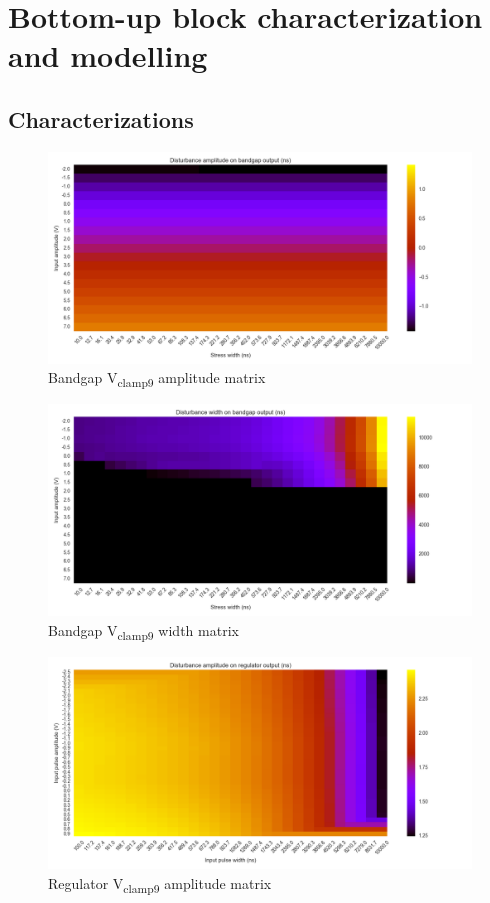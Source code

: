 \chapter{Bottom-up block characterization and modelling}
\section{Characterizations}
\label{apx:block-cz}

\begin{figure}[!h]
  \centering
  \includegraphics[width=\textwidth]{src/4/figures/bandgap_cz_v2_amplitude.png}
  \caption{Bandgap V\textsubscript{clamp9} amplitude matrix}
  \label{fig:bg_amp}
\end{figure}

\begin{figure}[!h]
  \centering
  \includegraphics[width=\textwidth]{src/4/figures/bandgap_cz_v2_width.png}
  \caption{Bandgap V\textsubscript{clamp9} width matrix}
  \label{fig:bg_width}
\end{figure}

\begin{figure}[!h]
  \centering
  \includegraphics[width=\textwidth]{src/4/figures/regulator_cz_v2_amplitude.png}
  \caption{Regulator V\textsubscript{clamp9} amplitude matrix}
  \label{fig:regu_amp}
\end{figure}

